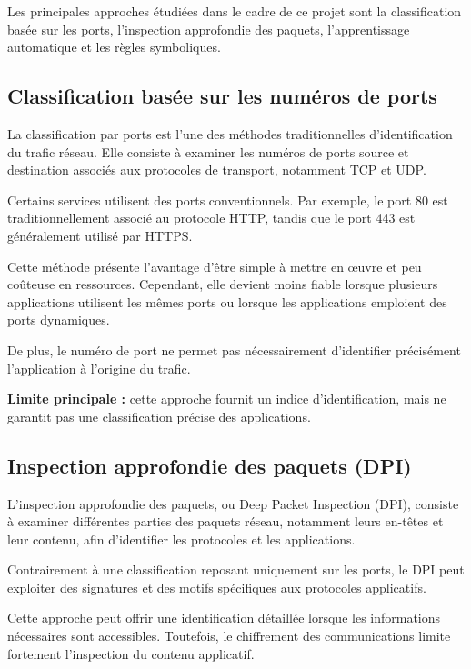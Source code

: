 Les principales approches étudiées dans le cadre de ce projet sont
la classification basée sur les ports, l'inspection approfondie des
paquets, l'apprentissage automatique et les règles symboliques.

\subsection{Classification basée sur les numéros de ports}

La classification par ports est l'une des méthodes traditionnelles
d'identification du trafic réseau. Elle consiste à examiner les
numéros de ports source et destination associés aux protocoles de
transport, notamment TCP et UDP.

Certains services utilisent des ports conventionnels. Par exemple,
le port 80 est traditionnellement associé au protocole HTTP, tandis
que le port 443 est généralement utilisé par HTTPS.

Cette méthode présente l'avantage d'être simple à mettre en œuvre
et peu coûteuse en ressources. Cependant, elle devient moins fiable
lorsque plusieurs applications utilisent les mêmes ports ou lorsque
les applications emploient des ports dynamiques.

De plus, le numéro de port ne permet pas nécessairement d'identifier
précisément l'application à l'origine du trafic.

\textbf{Limite principale :} cette approche fournit un indice
d'identification, mais ne garantit pas une classification précise
des applications.

\subsection{Inspection approfondie des paquets (DPI)}

L'inspection approfondie des paquets, ou Deep Packet Inspection
(DPI), consiste à examiner différentes parties des paquets réseau,
notamment leurs en-têtes et leur contenu, afin d'identifier les
protocoles et les applications.

Contrairement à une classification reposant uniquement sur les
ports, le DPI peut exploiter des signatures et des motifs spécifiques
aux protocoles applicatifs.

Cette approche peut offrir une identification détaillée lorsque
les informations nécessaires sont accessibles. Toutefois, le
chiffrement des communications limite fortement l'inspection du
contenu applicatif.

